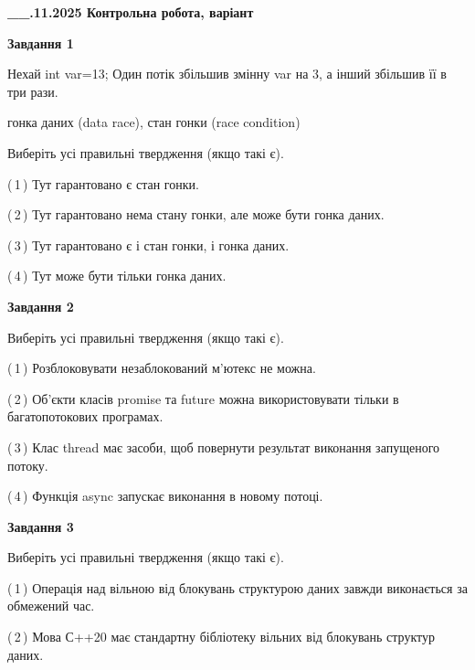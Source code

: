 \documentclass[12pt, ukrainian]{article}
\begin{document}
\begin {large}

\textbf{\_\_.11.2025 Контрольна робота, варіант  }\par


{

\begin{center}
\textbf{Завдання 1}
\end{center}
Нехай int var=13; Один потік збільшив змінну var на 3, а інший збільшив її в три рази.

гонка даних (data race), стан гонки (race condition)

Виберіть усі правильні твердження (якщо такі є).\par
\vspace{2mm}
(\,1\,) Тут гарантовано є стан гонки.%

(\,2\,) Тут гарантовано нема стану гонки, але може бути гонка даних.%

(\,3\,) Тут гарантовано є і стан гонки, і гонка даних.%

(\,4\,) Тут може бути тільки гонка даних.%



\begin{center}
\textbf{Завдання 2}
\end{center}
Виберіть усі правильні твердження (якщо такі є).\par
\vspace{2mm}

(\,1\,) Розблоковувати незаблокований м’ютекс не можна.%

(\,2\,) Об’єкти класів promise та future можна використовувати тільки в багатопотокових програмах.%

(\,3\,) Клас thread має засоби, щоб повернути результат виконання запущеного потоку.%

(\,4\,) Функція async запускає виконання в новому потоці.%



\begin{center}
\textbf{Завдання 3}
\end{center}
Виберіть усі правильні твердження (якщо такі є).\par
\vspace{2mm}

(\,1\,) Операція над вільною від блокувань структурою даних завжди виконається за обмежений час.%

(\,2\,) Мова С++20 має стандартну бібліотеку вільних від блокувань структур даних.%

}
\end{large}
\end{document}
